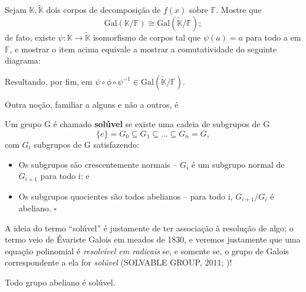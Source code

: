 \documentclass[../algebraIII_notes.tex]{subfiles}
\begin{document}
\begin{exr}
	Sejam \(\mathbb{K}, \tilde{\mathbb{K}}\) dois corpos de decomposição de \(f(x)\) sobre \(\mathbb{F}\). Mostre que
	\[
		\mathrm{Gal}(\mathbb{K}/\mathbb{F})\cong \mathrm{Gal}(\tilde{\mathbb{K}}/\mathbb{F});
	\]
	de fato, existe \(\psi :\mathbb{K}\rightarrow \tilde{\mathbb{K}}\) isomorfismo de corpos tal que \(\psi (a) = a\) para todo a em \(\mathbb{F}\), e mostrar o item acima equivale a mostrar a comutatividade do seguinte diagrama:
	\begin{center}
	\end{center}
	Resultando, por fim, em \(\psi \circ \phi \circ \psi^{-1}\in \mathrm{Gal}(\tilde{\mathbb{K}}/\mathbb{F})\).
\end{exr}

Outra noção, familiar a alguns e não a outros, é
\begin{def*}
	Um grupo G é chamado \textbf{solúvel} se existe uma cadeia de subgrupos de G
	\[
		\{e\} = G_{0}\subseteq G_1\subseteq \dotsc \subseteq G_{n} = G,
	\]
	com \(G_{i}\) subgrupos de G satisfazendo:
	\begin{itemize}
		\item[i)] Os subgrupos são crescentemente normais -- \(G_{i}\) é um subgrupo normal de \(G_{i+1}\) para todo i; e
		\item[ii)] Os subgrupos quocientes são todos abelianos -- para todo i, \(G_{i+1}/G_{i}\) é abeliano. \(\square\)
	\end{itemize}
\end{def*}
A ideia do termo ``solúvel'' é justamente de ter associação à resolução de algo; o termo veio de Évariste Galois em meados de 1830, e veremos justamente que uma equação polinomial é \textit{resolvível em radicais} se, e somente se, o grupo de Galois correspondente a ela for \textit{solúvel} (SOLVABLE GROUP, 2011; \cite{solvable2011})!
\begin{example}
	Todo grupo abeliano é solúvel.
\end{example}
\end{document}

